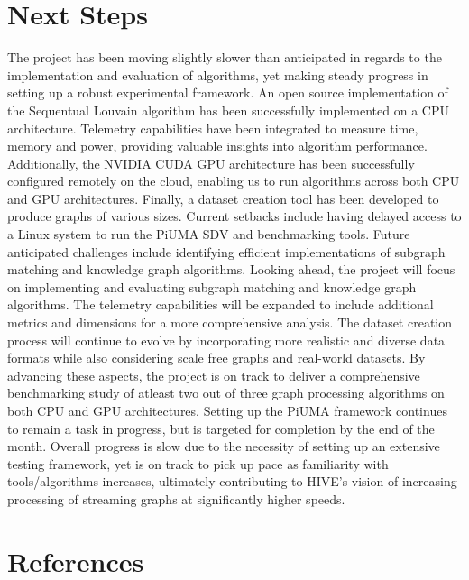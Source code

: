 \documentclass[letterpaper, 10pt]{article}
\begin{document}
\begin{multicols}{2}
    \section{Next Steps}\label{section:nextSteps}
        The project has been moving slightly slower than anticipated in regards to the implementation and evaluation of algorithms, yet making steady progress in setting up a robust experimental framework. An open source implementation of the Sequentual Louvain algorithm has been successfully implemented on a CPU architecture. Telemetry capabilities have been integrated to measure time, memory and power, providing valuable insights into algorithm performance. Additionally, the NVIDIA CUDA GPU architecture has been successfully configured remotely on the cloud, enabling us to run algorithms across both CPU and GPU architectures. Finally, a dataset creation tool has been developed to produce graphs of various sizes. Current setbacks include having delayed access to a Linux system to run the PiUMA SDV and benchmarking tools. Future anticipated challenges include identifying efficient implementations of subgraph matching and knowledge graph algorithms. Looking ahead, the project will focus on implementing and evaluating subgraph matching and knowledge graph algorithms. The telemetry capabilities will be expanded to include additional metrics and dimensions for a more comprehensive analysis. The dataset creation process will continue to evolve by incorporating more realistic and diverse data formats while also considering scale free graphs and real-world datasets. By advancing these aspects, the project is on track to deliver a comprehensive benchmarking study of atleast two out of three graph processing algorithms on both CPU and GPU architectures. Setting up the PiUMA framework continues to remain a task in progress, but is targeted for completion by the end of the month. Overall progress is slow due to the necessity of setting up an extensive testing framework, yet is on track to pick up pace as familiarity with tools/algorithms increases, ultimately contributing to HIVE's vision of increasing processing of streaming graphs at significantly higher speeds. 
    \section{References}
        \printbibliography[heading=none]


\end{multicols}
\end{document}
